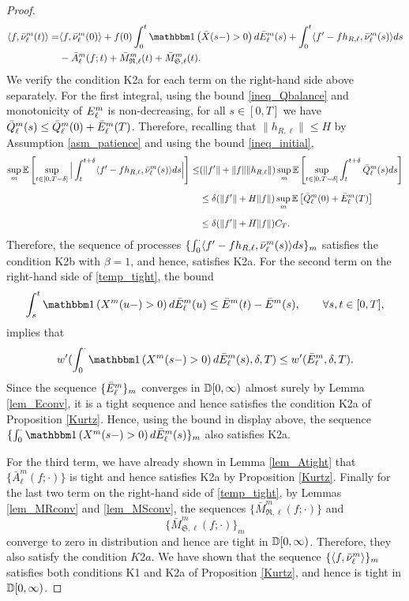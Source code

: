 \documentclass{article}
\theoremstyle{definition}
\numberwithin{equation}{section}
\begin{document}
\begin{proof}
\begin{align}\label{temp_tight}
    \langle f,\bnu^m_\ell(t) \rangle = & \langle f,\bnu^m_\ell(0)\rangle + f(0)\int_0^t \indic{\bx(s-)>0} d \barrival^m_\ell(s) + \int_0^t \langle f'-fh_{R,\ell},\bnu^m_\ell(s)\rangle ds \notag\\&-\bar A^m_\ell(f;t) +  \bar M^m_{\mathfrak{R},\ell}(t)+\bar M^m_{\mathfrak{S},\ell}(t).
\end{align}
We verify the condition K2a for each term on the right-hand side above separately. For the first integral, using the bound \eqref{ineq_Qbalance} and monotonicity of $E_\ell^m$ is non-decreasing, for all $s\in[0,T]$ we have
$\bar {Q}^m_\ell(s) \leq \bar {Q}_\ell^m(0)+ \bar E_\ell^m(T)$. Therefore, recalling that $\|h_{R,\ell}\|\leq H$ by Assumption \ref{asm_patience} and using the bound \eqref{ineq_initial},
\begin{align}\label{temp_tight1}
\sup_{m}\mathbb{E}\left[\sup_{t\in[0,T-\delta]}\Big| \int_{t}^{t+\delta}\langle f'-fh_{R,\ell},\bar{\nu}^m_\ell(s)\rangle ds \Big|\right]\leq & (\|f'\|+\|f\|\|h_{R,\ell}\|)\sup_{m}\mathbb{E}\left[\sup_{t\in[0,T-\delta]} \int_t^{t+\delta}\bar {Q}^m_\ell(s) ds \right]\notag\\[2mm]
&\leq \delta(\|f'\|+H\|f\|)\sup_{m}\mathbb{E}\left[\bar {Q}_\ell^m(0)+ \bar E_\ell^m(T)\right]\notag\\[2mm]
&\leq \delta(\|f'\|+H\|f\|)C_{T}.
\end{align}
Therefore, the sequence of processes $\{\int_{0}^{\cdot}\langle f'-fh_{R,\ell},\bar{\nu}^m_\ell(s)\rangle ds\}_m$ satisfies the condition K2b with $\beta=1$, and hence, satisfies K2a. For the second term on the right-hand side of \eqref{temp_tight}, the bound
\[
  \int_s^{t}\indic{X^m(u-)>0}d\barrival^m_{\ell}(u)\leq \barrival^m(t)-\barrival^m(s),
\quad\quad\forall s,t\in[0,T], 
\]
implies that
\[
w^\prime(\int_0^{\cdot}\indic{X^m(s-)>0}d\barrival^m_{\ell}(s),\delta,T)\leq w'(\barrival_\ell^m,\delta,T).
\]
Since the sequence $\{\bar E_\ell^m\}_m$ converges in $\mathbb{D}[0,\infty)$ almost surely by Lemma \ref{lem_Econv}, it is a tight sequence and hence satisfies the condition K2a of Proposition \ref{Kurtz}. Hence, using the bound in display above, the sequence $\{\int_0^\cdot\indic{X^m(s-)>0}d\barrival^m_{\ell}(s)\}_m$ also satisfies K2a.

For the third term, we have already shown in Lemma \ref{lem_Atight} that $\{\bar A^m_\ell(f;\cdot)\}$ is tight and hence satisfies K2a by Proposition \ref{Kurtz}. Finally for the last two term on the right-hand side of \eqref{temp_tight}, by Lemmas \ref{lem_MRconv} and \ref{lem_MSconv}, the sequences $\{\bar M^m_{\mathfrak{R},\ell}(f;\cdot)\}$ and $$\{\bar M^m_{\mathfrak{S},\ell}(f;\cdot)\}_m$$ converge to zero in distribution and hence are tight in $\mathbb{D}[0,\infty)$. Therefore, they also satisfy the condition $K2a$. We have shown that the sequence $\{\langle f,\bar{\nu}^m_\ell\rangle \}_m$ satisfies both conditions K1 and K2a of Proposition \ref{Kurtz}, and hence is tight in $\mathbb{D}[0,\infty)$.
\end{proof}
\end{document}
